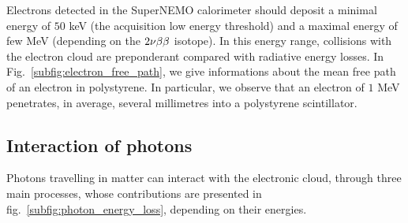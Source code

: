 Electrons detected in the SuperNEMO calorimeter should deposit a minimal energy of $50$ keV (the acquisition low energy threshold) and a maximal energy of few MeV (depending on the $2\nu\beta\beta$ isotope).
In this energy range, collisions with the electron cloud are preponderant compared with radiative energy losses.
In Fig.~\ref{subfig:electron_free_path}, we give informations about the mean free path of an electron in polystyrene.
In particular, we observe that an electron of $1$ MeV penetrates, in average, several millimetres into a polystyrene scintillator.


\subsection{Interaction of photons}

Photons travelling in  matter can interact with the electronic cloud, through three main processes, whose contributions are presented in fig.~\ref{subfig:photon_energy_loss}, depending on their energies.

